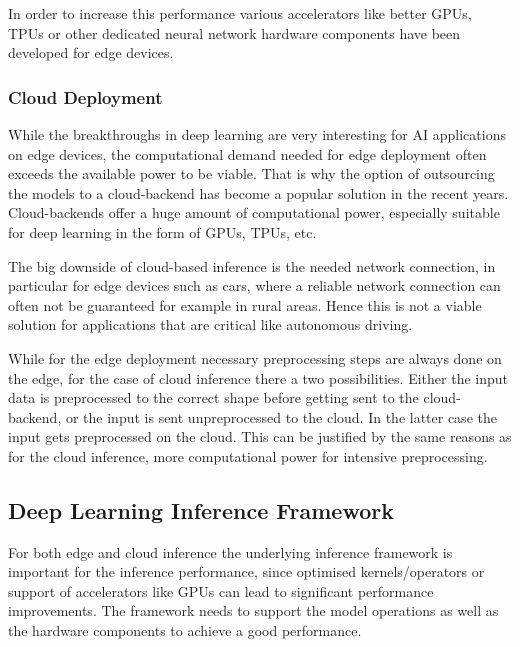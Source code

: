 In order to increase this performance various accelerators like better GPUs, TPUs or other dedicated neural network hardware components have been developed for edge devices.



\subsubsection{Cloud Deployment}
While the breakthroughs in deep learning are very interesting for AI applications on edge devices, the computational demand needed for edge deployment often exceeds the available power to be viable.
That is why the option of outsourcing the models to a cloud-backend has become a popular solution in the recent years.
Cloud-backends offer a huge amount of computational power, especially suitable for deep learning in the form of GPUs, TPUs, etc.


The big downside of cloud-based inference is the needed network connection, in particular for edge devices such as cars, where a reliable network connection can often not be guaranteed for example in rural areas. Hence this is not a viable solution for applications that are critical like autonomous driving.

While for the edge deployment necessary preprocessing steps are always done on the edge, for the case of cloud inference there a two possibilities. Either the input data is preprocessed to the correct shape before getting sent to the cloud-backend, or the input is sent unpreprocessed to the cloud. 
In the latter case the input gets preprocessed on the cloud. 
This can be justified by the same reasons as for the cloud inference, more computational power for intensive preprocessing.



\subsection{Deep Learning Inference Framework}
For both edge and cloud inference the underlying inference framework is important for the inference performance, since optimised kernels/operators or support of accelerators like GPUs can lead to significant performance improvements.
The framework needs to support the model operations as well as the hardware components to achieve a good performance.

